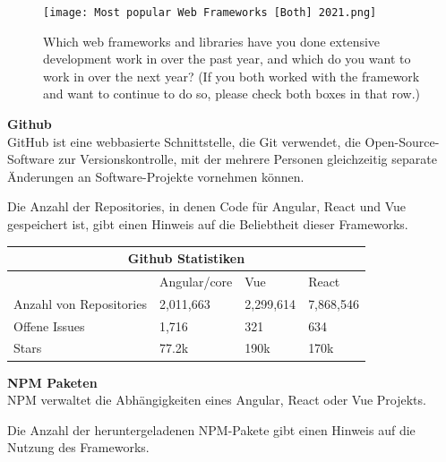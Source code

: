 \begin{figure}
  \centering
  \texttt{[image: Most popular Web Frameworks [Both] 2021.png]}
  \caption{ Which web frameworks and libraries have you done extensive development work in over the past year, and which do you want to work in over the next year? (If you both worked with the framework and want to continue to do so, please check both boxes in that row.) {\cite{SO01}}}

\end{figure}

\newpage
\begin{flushleft}
  \textbf{Github}\\
  GitHub ist eine webbasierte Schnittstelle, die Git verwendet, die Open-Source-Software zur Versionskontrolle, mit der mehrere Personen gleichzeitig separate Änderungen an Software-Projekte vornehmen können.
\end{flushleft}

Die Anzahl der Repositories, in denen Code für Angular, React und Vue gespeichert ist, gibt einen Hinweis auf die Beliebtheit dieser Frameworks.
\\
\begin{table}[h!]
  \centering
  \begin{tabular}{ |p{3cm}||p{3cm}|p{3.6cm}|p{3.6cm}|  }
    \hline
    \multicolumn{4}{|c|}{Github Statistiken}                        \\
    \hline
                            & Angular/core & Vue       & React     \\
    \hline
    Anzahl von Repositories & 2,011,663     & 2,299,614 & 7,868,546
    \\
    \hline
    Offene Issues           & 1,716         & 321       & 634
    \\
    \hline
    Stars                   & 77.2k         & 190k      & 170k
    \\
    \hline
  \end{tabular}
\end{table}

{\cite{GH01, GH02, GH03}}


\textbf{NPM Paketen}\\
NPM verwaltet die Abhängigkeiten eines Angular, React oder Vue Projekts.

Die Anzahl der heruntergeladenen NPM-Pakete gibt einen Hinweis auf die Nutzung des Frameworks.

